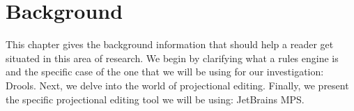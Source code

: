\chapter{Background}
\label{chapter:Background}

This chapter gives the background information that should help a reader get situated in this area of research.
We begin by clarifying what a rules engine is and the specific case of the one that we will be using for our investigation: Drools.
Next, we delve into the world of projectional editing.
Finally, we present the specific projectional editing tool we will be using: JetBrains MPS.



